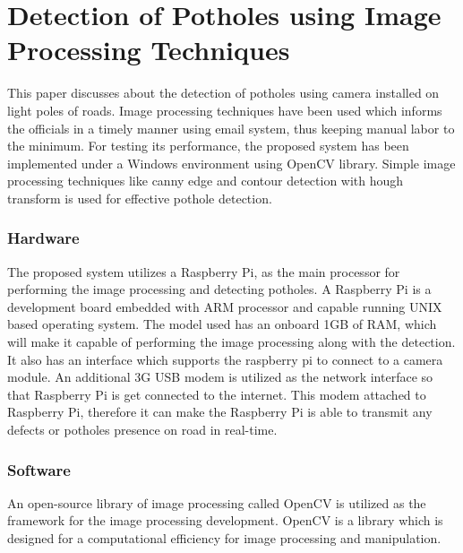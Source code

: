 \documentclass[12pt]{report}
\begin{document}
\section{Detection of Potholes using Image Processing Techniques}
This paper discusses about the detection of potholes using camera installed on light poles of roads. Image processing techniques have been used which informs the officials in a timely manner using email system, thus keeping manual labor to the minimum. For testing its performance, the proposed system has been implemented under a Windows environment using OpenCV library. Simple image processing techniques like canny edge and contour detection with hough transform is used for effective pothole detection\cite{A}.

\subsubsection{Hardware}
The proposed system utilizes a Raspberry Pi, as the main processor for performing the image processing and detecting potholes. A Raspberry Pi is a development board embedded with ARM processor and capable running UNIX based operating system. The model used has an onboard 1GB of RAM, which will make it capable of performing the image processing along with the detection. It also has an interface which supports the raspberry pi to connect to a camera module.
An additional 3G USB modem is utilized as the network interface so that Raspberry Pi is get connected to the internet. This modem attached to Raspberry Pi, therefore it can make the Raspberry Pi is able to transmit any defects or potholes presence on road in real-time\cite{A}.

\subsubsection{Software}
An open-source library of image processing called OpenCV is utilized as the framework for the image processing development. OpenCV is a library which is designed for a computational efficiency for image processing and manipulation.
\end{document}
